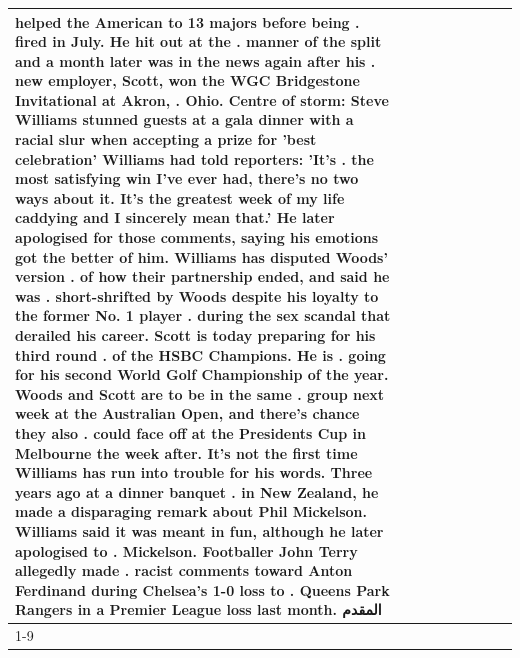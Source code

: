 \begin{table}[H]
\begin{tabular}{lllrlllll}
helped the American to 13 majors before being . fired in July. He hit out at the . manner of the split and a month later was in the news again after his . new employer, Scott, won the WGC Bridgestone Invitational at Akron, . Ohio. Centre of storm: Steve Williams stunned guests at a gala dinner with a racial slur when accepting a prize for 'best celebration' Williams had told reporters: 'It's . the most satisfying win I've ever had, there's no two ways about it. It's the greatest week of my life caddying and I sincerely mean that.' He later apologised for those comments, saying his emotions got the better of him. Williams has disputed Woods' version . of how their partnership ended, and said he was . short-shrifted by Woods despite his loyalty to the former No. 1 player . during the sex scandal that derailed his career. Scott is today preparing for his third round . of the HSBC Champions. He is . going for his second World Golf Championship of the year. Woods and Scott are to be in the same . group next week at the Australian Open, and there's chance they also . could face off at the Presidents Cup in Melbourne the week after. It's not the first time Williams has run into trouble for his words. Three years ago at a dinner banquet . in New Zealand, he made a disparaging remark about Phil Mickelson. Williams said it was meant in fun, although he later apologised to . Mickelson. Footballer John Terry allegedly made . racist comments toward Anton Ferdinand during Chelsea's 1-0 loss to . Queens Park Rangers in a Premier League loss last month. المقدم \\
\cline{1-9}

\end{tabular}
\end{table}
